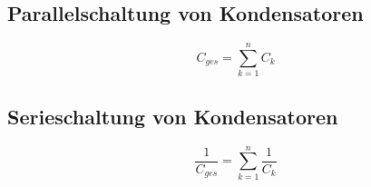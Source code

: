 



\subsection{Parallelschaltung von Kondensatoren}
\[ C_{ges} = \sum_{k=1}^{n} C_k \]

\subsection{Serieschaltung von Kondensatoren}
\[ \frac{1}{C_{ges}} = \sum_{k=1}^{n} \frac{1}{C_k} \]